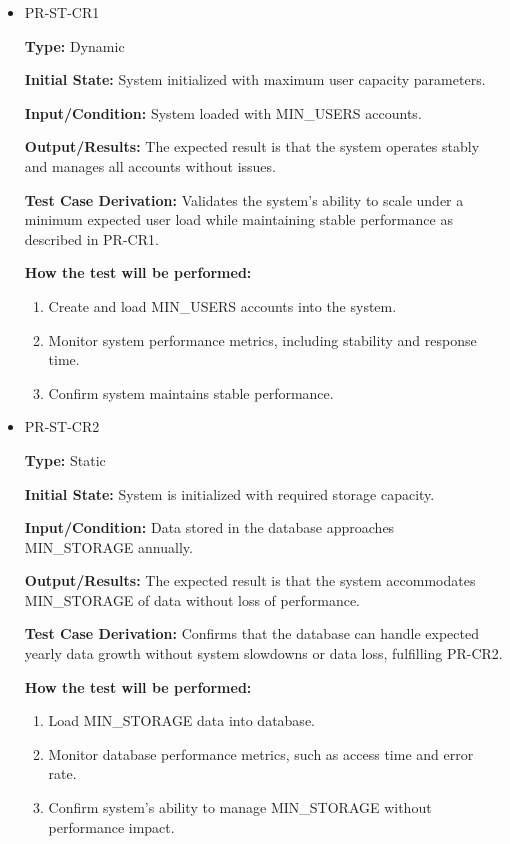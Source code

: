 \documentclass[12pt, titlepage]{article}
\begin{document}
\begin{itemize}
  \item PR-ST-CR1
  \begin{mdframed}[linewidth=0.5mm]
      \textbf{Type:} Dynamic \par
      \textbf{Initial State:} System initialized with maximum user capacity parameters. \par
      \textbf{Input/Condition:} System loaded with MIN\_USERS accounts. \par
      \textbf{Output/Results:} The expected result is that the system operates stably and manages all accounts without issues. \par
      \textbf{Test Case Derivation:} Validates the system’s ability to scale under a minimum expected user load while maintaining stable performance as described in PR-CR1. \par
      \textbf{How the test will be performed:}
      \begin{enumerate}[noitemsep]
        \item Create and load MIN\_USERS accounts into the system.
        \item Monitor system performance metrics, including stability and response time.
        \item Confirm system maintains stable performance.
      \end{enumerate}
  \end{mdframed}

  \item PR-ST-CR2
  \begin{mdframed}[linewidth=0.5mm]
      \textbf{Type:} Static \par
      \textbf{Initial State:} System is initialized with required storage capacity. \par
      \textbf{Input/Condition:} Data stored in the database approaches MIN\_STORAGE annually. \par
      \textbf{Output/Results:} The expected result is that the system accommodates \\ MIN\_STORAGE of data without loss of performance. \par
      \textbf{Test Case Derivation:} Confirms that the database can handle expected yearly data growth without system slowdowns or data loss, fulfilling PR-CR2. \par
      \textbf{How the test will be performed:}
      \begin{enumerate}[noitemsep]
        \item Load MIN\_STORAGE data into database.
        \item Monitor database performance metrics, such as access time and error rate.
        \item Confirm system’s ability to manage MIN\_STORAGE without performance impact.
      \end{enumerate}
  \end{mdframed}
\end{itemize}
\end{document}
